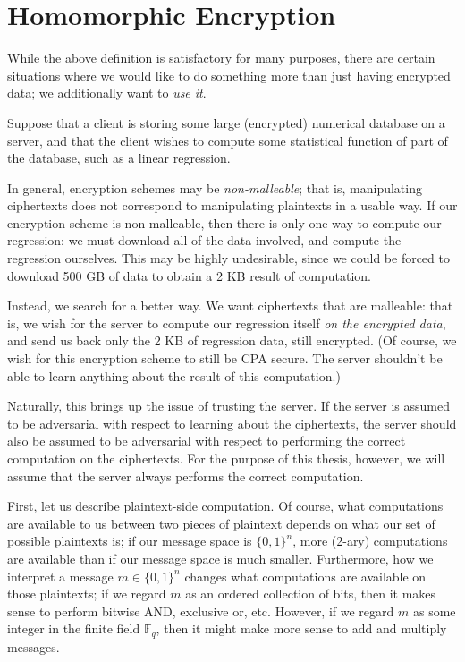 \section{Homomorphic Encryption} \label{sec:lkj}
While the above definition is satisfactory for many purposes, there are certain situations where we would like to do something more than just having encrypted data; we additionally want to \emph{use it}.

Suppose that a client is storing some large (encrypted) numerical database on a server, and that the client wishes to compute some statistical function of part of the database, such as a linear regression.

 In general, encryption schemes may be \emph{non-malleable}; that is, manipulating ciphertexts does not correspond to manipulating plaintexts in a usable way. If our encryption scheme is non-malleable, then there is only one way to compute our regression: we must download all of the data involved, and compute the regression ourselves. This may be highly undesirable, since we could be forced to download 500 GB of data to obtain a 2 KB result of computation.

 Instead, we search for a better way. We want ciphertexts that are malleable: that is, we wish for the server to compute our regression itself \emph{on the encrypted data}, and send us back only the 2 KB of regression data, still encrypted. (Of course, we wish for this encryption scheme to still be CPA secure. The server shouldn't be able to learn anything about the result of this computation.)

 Naturally, this brings up the issue of trusting the server. If the server is assumed to be adversarial with respect to learning about the ciphertexts, the server should also be assumed to be adversarial with respect to performing the correct computation on the ciphertexts. For the purpose of this thesis, however, we will assume that the server always performs the correct computation.


First, let us describe plaintext-side computation. Of course, what computations are available to us between two pieces of plaintext depends on what our set of possible plaintexts is; if our message space is $\{0,1\}^n$, more (2-ary) computations are available than if our message space is much smaller. Furthermore, how we interpret a message $m \in \{0,1\}^n$ changes what computations are available on those plaintexts; if we regard $m$ as an ordered collection of bits, then it makes sense to perform bitwise AND, exclusive or, etc. However, if we regard $m$ as some integer in the finite field $\mathbb{F}_q$, then it might make more sense to add and multiply messages.

